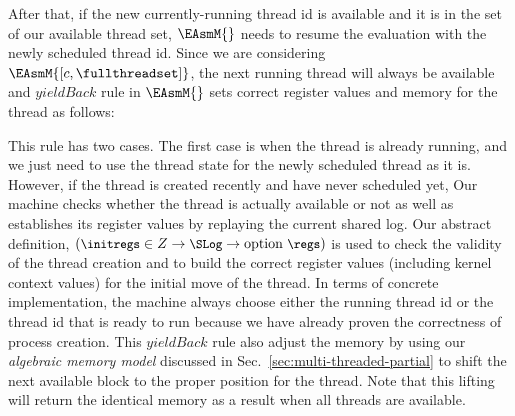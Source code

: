 After that, if the new currently-running thread id is available and it is in the set of our available thread set,
$\EAsmM{}$ needs to resume the evaluation with the newly scheduled thread id. 
Since we are considering $\EAsmM{[c, \fullthreadset]}$, the next running thread will always be 
available and $yieldBack$ rule in $\EAsmM{}$ sets correct register values and memory for the thread as follows:
\begin{tiny}
\begin{mathpar}
\end{mathpar}
\end{tiny}
This rule has two cases. 
The first case is when the thread is already running, and we just need to use the thread state for the newly scheduled thread as it is.
However, if the thread is created recently and have never scheduled yet, 
Our machine checks whether the thread is actually available or not as well as establishes its register values by replaying the current shared log. 
Our abstract definition, 
$\begin{small}(\initregs \in Z \rightarrow \SLog \rightarrow \mathrm{option}\ \regs) \end{small}$ 
is used to check the validity of the thread creation and to build the 
correct register values (including kernel context values) for the initial move of the thread. 
In terms of concrete implementation, the machine always choose either the running thread id or the thread id that is ready to run
because we have already proven the correctness of process creation.
This $yieldBack$ rule also 
adjust the memory by using our \textit{algebraic memory model} discussed in Sec.~\ref{sec:multi-threaded-partial}
to shift the next 
available block to the proper position for the thread. 
Note that this lifting will return the identical memory as a result when all threads are available.



